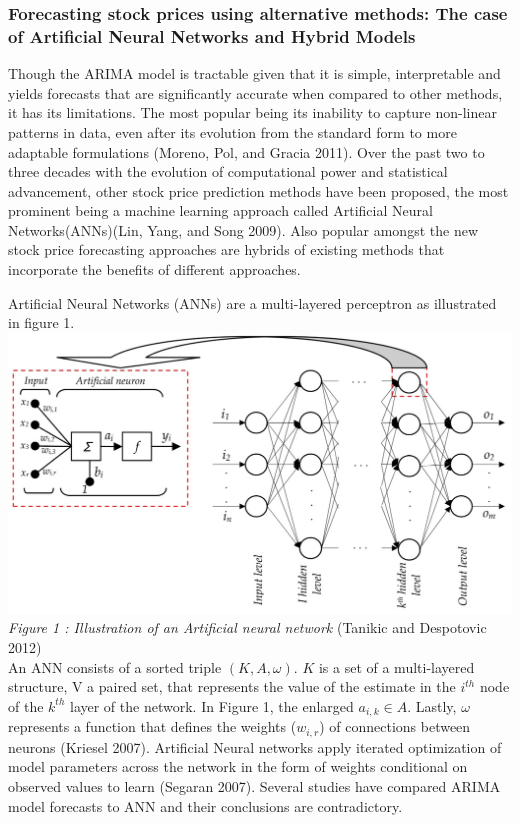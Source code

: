 \documentclass[12pt,a4paper]{article}
\numberwithin{equation}{section}
\numberwithin{figure}{section}
\numberwithin{table}{section}
\begin{document}
\subsubsection{Forecasting stock prices using alternative methods: The
case of Artificial Neural Networks and Hybrid
Models}\label{forecasting-stock-prices-using-alternative-methods-the-case-of-artificial-neural-networks-and-hybrid-models}

Though the ARIMA model is tractable given that it is simple,
interpretable and yields forecasts that are significantly accurate when
compared to other methods, it has its limitations. The most popular
being its inability to capture non-linear patterns in data, even after
its evolution from the standard form to more adaptable formulations
(Moreno, Pol, and Gracia 2011). Over the past two to three decades with
the evolution of computational power and statistical advancement, other
stock price prediction methods have been proposed, the most prominent
being a machine learning approach called Artificial Neural
Networks(ANNs)(Lin, Yang, and Song 2009). Also popular amongst the new
stock price forecasting approaches are hybrids of existing methods that
incorporate the benefits of different approaches.

Artificial Neural Networks (ANNs) are a multi-layered perceptron as
illustrated in figure 1.\\
\includegraphics{ANN.png}\\
\emph{Figure 1 : Illustration of an Artificial neural network} (Tanikic
and Despotovic 2012)\\
An ANN consists of a sorted triple \((K, A, \omega)\). \(K\) is a set of
a multi-layered structure, V a paired set, that represents the value of
the estimate in the \(i^{th}\) node of the \(k^{th}\) layer of the
network. In Figure 1, the enlarged \(a_{i,k} \in A\). Lastly, \(\omega\)
represents a function that defines the weights (\(w_{i,r}\)) of
connections between neurons (Kriesel 2007). Artificial Neural networks
apply iterated optimization of model parameters across the network in
the form of weights conditional on observed values to learn (Segaran
2007). Several studies have compared ARIMA model forecasts to ANN and
their conclusions are contradictory.
\end{document}
